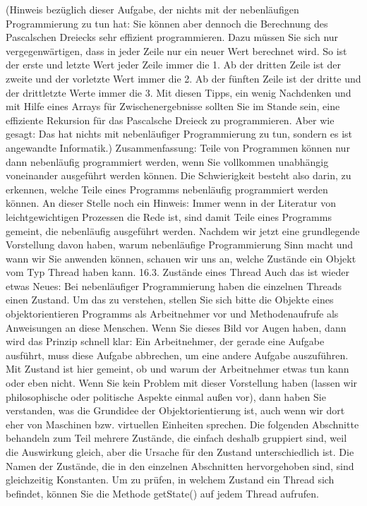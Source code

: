 (Hinweis bezüglich dieser Aufgabe, der nichts mit der nebenläufigen Programmierung zu tun hat: Sie können aber dennoch die Berechnung des Pascalschen Dreiecks sehr effizient programmieren. Dazu müssen Sie sich nur vergegenwärtigen, dass in jeder Zeile nur ein neuer Wert berechnet wird. So ist der erste und letzte Wert jeder Zeile immer die 1. Ab der dritten Zeile ist der zweite und der vorletzte Wert immer die 2. Ab der fünften Zeile ist der dritte und der drittletzte Werte immer die 3. Mit diesen Tipps, ein wenig Nachdenken und mit Hilfe eines Arrays für Zwischenergebnisse sollten Sie im Stande sein, eine effiziente Rekursion für das Pascalsche Dreieck zu programmieren. Aber wie gesagt: Das hat nichts mit nebenläufiger Programmierung zu tun, sondern es ist angewandte Informatik.)
Zusammenfassung:
Teile von Programmen können nur dann nebenläufig programmiert werden, wenn Sie vollkommen unabhängig voneinander ausgeführt werden können. Die Schwierigkeit besteht also darin, zu erkennen, welche Teile eines Programms nebenläufig programmiert werden können.
An dieser Stelle noch ein Hinweis: Immer wenn in der Literatur von leichtgewichtigen Prozessen die Rede ist, sind damit Teile eines Programms gemeint, die nebenläufig ausgeführt werden.
Nachdem wir jetzt eine grundlegende Vorstellung davon haben, warum nebenläufige Programmierung Sinn macht und wann wir Sie anwenden können, schauen wir uns an, welche Zustände ein Objekt vom Typ Thread haben kann.
16.3.	Zustände eines Thread
Auch das ist wieder etwas Neues: Bei nebenläufiger Programmierung haben die einzelnen Threads einen Zustand. Um das zu verstehen, stellen Sie sich bitte die Objekte eines objektorientieren Programms als Arbeitnehmer vor und Methodenaufrufe als Anweisungen an diese Menschen. Wenn Sie dieses Bild vor Augen haben, dann wird das Prinzip schnell klar: Ein Arbeitnehmer, der gerade eine Aufgabe ausführt, muss diese Aufgabe abbrechen, um eine andere Aufgabe auszuführen. Mit Zustand ist hier gemeint, ob und warum der Arbeitnehmer etwas tun kann oder eben nicht.
Wenn Sie kein Problem mit dieser Vorstellung haben (lassen wir philosophische oder politische Aspekte einmal außen vor), dann haben Sie verstanden, was die Grundidee der Objektorientierung ist, auch wenn wir dort eher von Maschinen bzw. virtuellen Einheiten sprechen.
Die folgenden Abschnitte behandeln zum Teil mehrere Zustände, die einfach deshalb gruppiert sind, weil die Auswirkung gleich, aber die Ursache für den Zustand unterschiedlich ist. Die Namen der Zustände, die in den einzelnen Abschnitten hervorgehoben sind, sind gleichzeitig Konstanten. Um zu prüfen, in welchem Zustand ein Thread sich befindet, können Sie die Methode getState() auf jedem Thread aufrufen.
